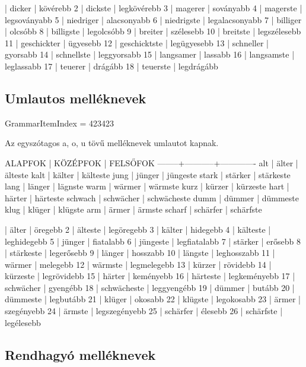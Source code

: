 \documentclass{article}
\newenvironment{desc}{\verbatim}{\endverbatim}
\newenvironment{exmp}{\verbatim}{\endverbatim}
\begin{document}
\begin{exmp}
1 | dicker | kövérebb
2 | dickste | legkövérebb
3 | magerer | soványabb
4 | magerste | legsoványabb
5 | niedriger | alacsonyabb
6 | niedrigste | legalacsonyabb
7 | billiger | olcsóbb
8 | billigste | legolcsóbb
9 | breiter | szélesebb
10 | breitste | legszélesebb
11 | geschickter | ügyesebb
12 | geschicktste | legügyesebb
13 | schneller | gyorsabb
14 | schnellste | leggyorsabb
15 | langsamer | lassabb
16 | langsamste | leglassabb
17 | teuerer | drágább
18 | teuerste | legdrágább
\end{exmp}

\subsection{Umlautos melléknevek}

GrammarItemIndex = 423423

\begin{desc}
Az egyszótagos a, o, u tövű melléknevek umlautot kapnak.

ALAPFOK | KÖZÉPFOK  | FELSŐFOK
--------+-----------+-------------
alt     | älter     | älteste
kalt    | kälter    | kälteste
jung    | jünger    | jüngeste
stark   | stärker   | stärkeste
lang    | länger    | lägnste
warm    | wärmer    | wärmste
kurz    | kürzer    | kürzeste
hart    | härter    | härteste
schwach | schwächer | schwächeste
dumm    | dümmer    | dümmeste
klug    | klüger    | klügste
arm     | ärmer     | ärmste
scharf  | schärfer  | schärfste
\end{desc}

\begin{exmp}
1 | älter | öregebb
2 | älteste | legöregebb
3 | kälter | hidegebb
4 | kälteste | leghidegebb
5 | jünger | fiatalabb
6 | jüngeste | legfiatalabb
7 | stärker | erősebb
8 | stärkeste | legerősebb
9 | länger | hosszabb
10 | längste | leghosszabb
11 | wärmer | melegebb
12 | wärmste | legmelegebb
13 | kürzer | rövidebb
14 | kürzeste | legrövidebb
15 | härter | keményebb
16 | härteste | legkeményebb
17 | schwächer | gyengébb
18 | schwächeste | leggyengébb
19 | dümmer | butább
20 | dümmeste | legbutább
21 | klüger | okosabb
22 | klügste | legokosabb
23 | ärmer | szegényebb
24 | ärmste | legszegényebb
25 | schärfer | élesebb
26 | schärfste | legélesebb
\end{exmp}

\subsection{Rendhagyó melléknevek}
\end{document}
